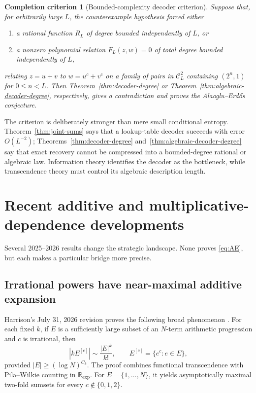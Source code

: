 \documentclass[11pt,oneside]{article}
\newtheorem{criterion}[theorem]{Completion criterion}
\theoremstyle{definition}
\theoremstyle{remark}
\newcommand{\R}{\mathbb{R}}
\newcommand{\abs}[1]{\left|#1\right|}
\begin{document}
\begin{criterion}[Bounded-complexity decoder criterion]\label{crit:bounded-decoder}
Suppose that, for arbitrarily large \(L\), the counterexample hypothesis forced either
\begin{enumerate}
 \item a rational function \(R_L\) of degree bounded independently of \(L\), or
 \item a nonzero polynomial relation \(F_L(z,w)=0\) of total degree bounded independently of \(L\),
\end{enumerate}
relating \(z=u+v\) to \(w=u^c+v^c\) on a family of pairs in \(\mathcal C_L^2\) containing \((2^n,1)\) for \(0\leq n<L\).  Then Theorem~\ref{thm:decoder-degree} or Theorem~\ref{thm:algebraic-decoder-degree}, respectively, gives a contradiction and proves the Alaoglu--Erd\H{o}s conjecture.
\end{criterion}

The criterion is deliberately stronger than mere small conditional entropy.  Theorem~\ref{thm:joint-sums} says that a lookup-table decoder succeeds with error \(O(L^{-2})\); Theorems~\ref{thm:decoder-degree} and~\ref{thm:algebraic-decoder-degree} say that exact recovery cannot be compressed into a bounded-degree rational or algebraic law.  Information theory identifies the decoder as the bottleneck, while transcendence theory must control its algebraic description length.

\section{Recent additive and multiplicative-dependence developments}\label{sec:recent-additive}

Several 2025--2026 results change the strategic landscape.  None proves \eqref{eq:AE}, but each makes a particular bridge more precise.

\subsection{Irrational powers have near-maximal additive expansion}

Harrison's July 31, 2026 revision proves the following broad phenomenon \cite{Harrison2026}.  For each fixed \(k\), if \(E\) is a sufficiently large subset of an \(N\)-term arithmetic progression and \(c\) is irrational, then
\begin{equation}\label{eq:harrison}
 \abs{kE^{[c]}}\sim\frac{\abs E^k}{k!},
 \qquad E^{[c]}=\{e^c:e\in E\},
\end{equation}
provided \(\abs E\geq(\log N)^{C_k}\).  The proof combines functional transcendence with Pila--Wilkie counting in \(\R_{\exp}\).  For \(E=\{1,\ldots,N\}\), it yields asymptotically maximal two-fold sumsets for every \(c\notin\{0,1,2\}\).
\end{document}
